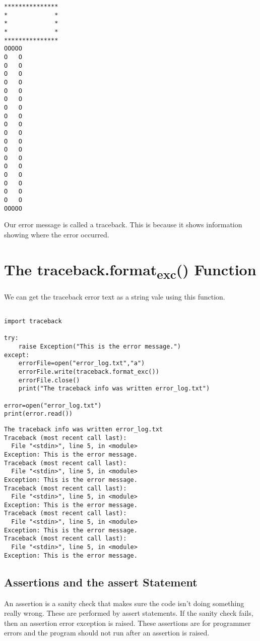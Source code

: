\documentclass[11pt]{article}
\begin{document}
\begin{verbatim}
***************
*             *
*             *
*             *
***************
OOOOO
O   O
O   O
O   O
O   O
O   O
O   O
O   O
O   O
O   O
O   O
O   O
O   O
O   O
O   O
O   O
O   O
O   O
O   O
OOOOO
\end{verbatim}

Our error message is called a traceback. This is because it shows information showing where the error occurred.

\section{The traceback.format\textsubscript{exc}() Function}
\label{sec:org42ee19c}

We can get the traceback error text as a string vale using this function.


\begin{verbatim}

import traceback

try:
    raise Exception("This is the error message.")
except:
    errorFile=open("error_log.txt","a")
    errorFile.write(traceback.format_exc())
    errorFile.close()
    print("The traceback info was written error_log.txt")

error=open("error_log.txt")
print(error.read())

\end{verbatim}

\begin{verbatim}
The traceback info was written error_log.txt
Traceback (most recent call last):
  File "<stdin>", line 5, in <module>
Exception: This is the error message.
Traceback (most recent call last):
  File "<stdin>", line 5, in <module>
Exception: This is the error message.
Traceback (most recent call last):
  File "<stdin>", line 5, in <module>
Exception: This is the error message.
Traceback (most recent call last):
  File "<stdin>", line 5, in <module>
Exception: This is the error message.
Traceback (most recent call last):
  File "<stdin>", line 5, in <module>
Exception: This is the error message.

\end{verbatim}

\subsection{Assertions and the assert Statement}
\label{sec:orge8d8ec7}

An assertion is a sanity check that makes sure the code isn't doing something really wrong. These are performed by assert statements. If the sanity check fails, then an assertion error exception is raised. These assertions are for programmer errors and the program should not run after an assertion is raised.
\end{document}
